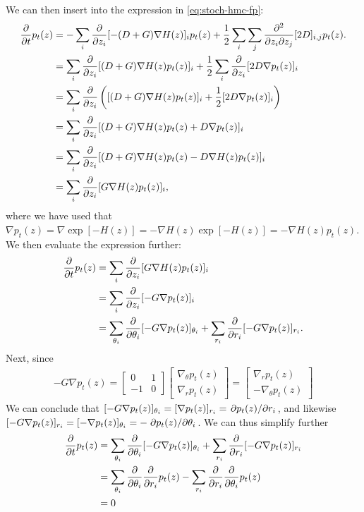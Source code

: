 We can then insert into the expression in \cref{eq:stoch-hmc-fp}:
\begin{align} 
    \pdv{t} p_t(z) &= - \sum_{i} \pdv{z_i} [ -(D+G)\nabla H(z)]_i p_t(z) 
    + \frac{1}{2}\sum_{i}\sum_{j}\pdv{}{z_i}{z_j}[2D]_{i,j}p_t(z). \\
    &=  \sum_{i} \pdv{z_i} [ (D+G)\nabla H(z)p_t(z)]_i 
    + \frac{1}{2}\sum_{i}\pdv{z_i}[2D \nabla p_t(z)]_{i} \\
    &=  \sum_{i} \pdv{z_i} \left([ (D+G)\nabla H(z)p_t(z)]_i 
    + \frac{1}{2}[2D \nabla p_t(z)]_{i}\right) \\
    &=  \sum_{i} \pdv{z_i} [ (D+G)\nabla H(z)p_t(z) 
    + D \nabla p_t(z)]_{i} \\
    &=  \sum_{i} \pdv{z_i} [ (D+G)\nabla H(z)p_t(z) 
    - D \nabla H(z) p_t(z)]_{i} \\
    &=  \sum_{i} \pdv{z_i} [ G\nabla H(z)p_t(z)]_i,
\end{align}
where we have used that $\nabla p_t(z) = \nabla \exp[-H(z)]= -\nabla H(z) \exp[-H(z)] =  -\nabla H(z) p_t(z)$.
We then evaluate the expression further:
\begin{align}
    \pdv{t} p_t(z) &= \sum_{i} \pdv{z_i} [ G\nabla H(z)p_t(z)]_i \\
    &= \sum_{i} \pdv{z_i} [ -G\nabla p_t(z)]_i \\
    &= \sum_{\theta_i} \pdv{\theta_i} [ -G\nabla p_t(z)]_{\theta_i}
    + \sum_{r_i} \pdv{r_i} [ -G\nabla p_t(z)]_{r_i}.
\end{align}
Next, since 
\begin{align}
    -G\nabla p_t(z) = \begin{bmatrix}0 & 1 \\ -1 & 0 \end{bmatrix}
    \begin{bmatrix}
        \nabla_\theta p_t(z) \\ 
        \nabla_r p_t(z)
    \end{bmatrix} = \begin{bmatrix}
        \nabla_r p_t(z) \\
        -\nabla_\theta p_t(z) 
    \end{bmatrix}
\end{align}
We can conclude that $[-G\nabla p_t(z)]_{\theta_i} = [\nabla p_t(z)]_{r_i} = \pdv*{p_t(z)}{r_i}$, and likewise $[-G\nabla p_t(z)]_{r_i} = [-\nabla p_t(z)]_{\theta_i} =-\pdv*{p_t(z)}{\theta_i}$.
We can thus simplify further
\begin{align}
    \pdv{t} p_t(z) 
    &= \sum_{\theta_i} \pdv{\theta_i} [ -G\nabla p_t(z)]_{\theta_i}
    + \sum_{r_i} \pdv{r_i} [ -G\nabla p_t(z)]_{r_i} \\
    &= \sum_{\theta_i} \pdv{\theta_i} \pdv{r_i} p_t(z)
    - \sum_{r_i} \pdv{r_i} \pdv{\theta_i} p_t(z)\\
    &= 0
\end{align}

